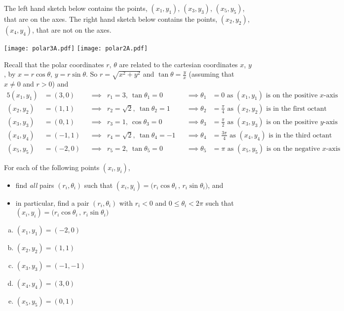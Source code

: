 \begin{solution}
The left hand sketch below contains the points, $(x_1,y_1)$, $(x_3,y_3)$,
$(x_5,y_5)$, that are on the axes. The right hand sketch below contains the
points, $(x_2,y_2)$, $(x_4,y_4)$, that are not on the axes.
\begin{center}
  \texttt{[image: polar3A.pdf]}\quad
  \texttt{[image: polar2A.pdf]}
\end{center}
Recall that the polar coordinates $r$, $\theta$
are related to the cartesian coordinates $x$, $y$, by $x=r\cos\theta$,
$y=r\sin\theta$. So $r=\sqrt{x^2+y^2}$ and $\tan\theta=\frac{y}{x}$
(assuming that $x\ne 0$ and $r>0$) and
\begin{alignat*}{5}
(x_1,y_1) &= (3,0) &&\implies &r_1=3,\ \tan\theta_1=0
                   &&\implies \theta_1&=0 
                   \text{ as $(x_1,y_1)$ is on the positive $x$-axis} \\
(x_2,y_2) &= (1,1) &&\implies &r_2=\sqrt{2},\ \tan\theta_2=1
                   &&\implies \theta_2&=\frac{\pi}{4} 
                   \text{ as $(x_2,y_2)$ is in the first octant} \\
(x_3,y_3) &= (0,1) &&\implies &r_3=1,\ \cos\theta_3=0
                   &&\implies \theta_3&=\frac{\pi}{2} 
                   \text{ as $(x_3,y_3)$ is on the positive $y$-axis} \\
(x_4,y_4) &= (-1,1) &&\implies &r_4=\sqrt{2},\ \tan\theta_4=-1
                   &&\implies \theta_4&=\frac{3\pi}{4} 
                   \text{ as $(x_4,y_4)$ is in the third octant} \\
(x_5,y_5) &= (-2,0) &&\implies &r_5=2,\ \tan\theta_5=0
                   &&\implies \theta_5&=\pi 
                   \text{ as $(x_5,y_5)$ is on the negative $x$-axis} 
\end{alignat*}
\end{solution}


\begin{question}
For each of the following points $(x_i,y_i)$,
\begin{itemize}
\item
find \emph{all} pairs $(r_i,\theta_i)$ such that 
  $(x_i,y_i) = \big(r_i\cos\theta_i\,,\,r_i\sin\theta_i\big)$, and
\item
 in particular, find a pair $(r_i,\theta_i)$ with $r_i<0$ and 
$0\le\theta_i<2\pi$ such that 
  $(x_i,y_i) = \big(r_i\cos\theta_i\,,\,r_i\sin\theta_i\big)$
\end{itemize}

\begin{enumerate}[(a)]
\item
$ (x_1,y_1) = (-2,0) $ 
\item
$ (x_2,y_2) = (1,1) $ 
\item
$ (x_3,y_3) = (-1,-1) $ 
\item
$ (x_4,y_4) = (3,0) $ 
\item
$ (x_5,y_5) = (0,1) $ 
\end{enumerate}
\end{question}

